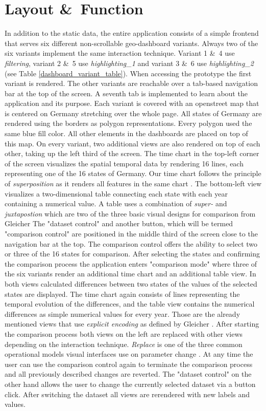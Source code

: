 \section{Layout \&\ Function}
In addition to the static data, the entire application consists of a simple frontend that serves six different non-scrollable
geo-dashboard variants. Always two of the six variants implement the same interaction technique. Variant 1 \&\ 4 use
\textit{filtering}, variant 2 \&\ 5 use \textit{highlighting\_1} and variant 3 \&\ 6 use \textit{highlighting\_2}
(see Table \ref{dashboard_variant_table}). When accessing the prototype the first variant is rendered. The other variants are
reachable over a tab-based navigation bar at the top of the screen. A seventh tab is implemented to learn about the application
and its purpose. Each variant is covered with an openstreet map that is centered on Germany stretching over the whole page. All
states of Germany are rendered using the borders as polygon representations. Every polygon used the same
blue fill color. All other elements in the dashboards are placed on top of this map. On every variant, two additional views
are also rendered on top of each other, taking up the left third of the screen. The time chart in the top-left corner of the
screen visualizes the spatial temporal data by rendering 16 lines, each representing one of the 16 states of Germany. Our time chart
follows the principle of \textit{superposition} as it renders all features in the same chart \citep*{Gleicher.2018}. The
bottom-left view visualizes a two-dimensional table connecting each state with each year containing a numerical value.
A table uses a combination of \textit{super-} and \textit{juxtapostion} which are two of the three basic visual designs for comparison
from Gleicher \citep*{Gleicher.2018} The "dataset control" and another button, which will be termed "comparison control" are positioned
in the middle third of the screen close to the navigation bar at the top. The comparison control offers the ability to select two or three of the 16
states for comparison. After selecting the states and confirming the comparison process the application enters "comparison mode" 
where three of the six variants render an additional time chart and an additional table view. In both views calculated differences
between two states of the values of the selected states are displayed. The time chart again consists of lines representing the temporal
evolution of the differences, and the table view contains the numerical differences as simple numerical values for every year.
Those are the already mentioned views that use \textit{explicit encoding} as defined by Gleicher \citep*{Gleicher.2018}. After
starting the comparison process both views on the left are replaced with other views depending on the interaction technique. \textit{Replace}
is one of the three common operational models visual interfaces use on parameter change \citep*{Costabile.2004, Roberts.2008}. At any time
the user can use the comparison control again to terminate the comparison process and all previously described changes are
reverted. The "dataset control" on the other hand allows the user to change the currently selected dataset via a button click.
After switching the dataset all views are rerendered with new labels and values.

